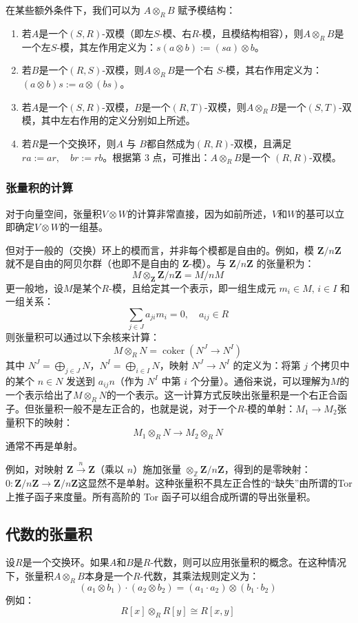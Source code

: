 在某些额外条件下，我们可以为 \( A \otimes_R B \) 赋予模结构：

\begin{enumerate}
\item 若\( A \)是一个\( (S, R) \)-双模（即左\( S \)-模、右\( R \)-模，且模结构相容），则\(A \otimes_R B\)是一个左\( S \)-模，其左作用定义为：\(s(a \otimes b) := (sa) \otimes b\)。
\item 若\( B \)是一个\( (R, S) \)-双模，则\(A \otimes_R B\)是一个右 \( S \)-模，其右作用定义为：\((a \otimes b)s := a \otimes (bs)\)。
\item 若\( A \)是一个\( (S, R) \)-双模，\( B \)是一个\( (R, T) \)-双模，则\(A \otimes_R B \)是一个\( (S, T) \)-双模，其中左右作用的定义分别如上所述。
\item 若\( R \)是一个交换环，则\( A \) 与 \( B \)都自然成为\( (R, R) \)-双模，且满足\(ra := ar, \quad br := rb\)。根据第 3 点，可推出：\(A \otimes_R B\)是一个 \( (R, R) \)-双模。
\end{enumerate}
\subsubsection{张量积的计算}
对于向量空间，张量积\( V \otimes W \)的计算非常直接，因为如前所述，\( V \)和\( W \)的基可以立即确定\( V \otimes W \)的一组基。

但对于一般的（交换）环上的模而言，并非每个模都是自由的。例如，模 \( \mathbf{Z}/n\mathbf{Z} \) 就不是自由的阿贝尔群（也即不是自由的 \( \mathbf{Z} \)-模）。与 \( \mathbf{Z}/n\mathbf{Z} \) 的张量积为：
\[
M \otimes_{\mathbf{Z}} \mathbf{Z}/n\mathbf{Z} = M / nM~
\]
更一般地，设\( M \)是某个\( R \)-模，且给定其一个表示，即一组生成元 \( m_i \in M,\, i \in I \) 和一组关系：
\[
\sum_{j \in J} a_{ji} m_i = 0,\quad a_{ij} \in R~
\]
则张量积可以通过以下余核来计算：
\[
M \otimes_R N = \operatorname{coker}(N^J \to N^I)~
\]
其中 \( N^J = \bigoplus_{j \in J} N \)，\( N^I = \bigoplus_{i \in I} N \)，映射 \( N^J \to N^I \) 的定义为：将第 \( j \) 个拷贝中的某个 \( n \in N \) 发送到 \( a_{ij} n \)（作为 \( N^I \) 中第 \( i \) 个分量）。通俗来说，可以理解为\( M \)的一个表示给出了\( M \otimes_R N \)的一个表示。这一计算方式反映出张量积是一个右正合函子。但张量积一般不是左正合的，也就是说，对于一个\( R \)-模的单射：\(M_1 \to M_2\)张量积下的映射：
\[
M_1 \otimes_R N \to M_2 \otimes_R N~
\]
通常不再是单射。

例如，对映射 \( \mathbf{Z} \xrightarrow{n} \mathbf{Z} \)（乘以 \( n \)）施加张量 \( \otimes_{\mathbb{Z}} \mathbf{Z}/n\mathbf{Z} \)，得到的是零映射：\(0 : \mathbf{Z}/n\mathbf{Z} \to \mathbf{Z}/n\mathbf{Z}\)这显然不是单射。这种张量积不具左正合性的“缺失”由所谓的Tor 上推子函子来度量。所有高阶的 Tor 函子可以组合成所谓的导出张量积。
\subsection{代数的张量积}
设\( R \)是一个交换环。如果\( A \)和\( B \)是\( R \)-代数，则可以应用张量积的概念。在这种情况下，张量积\( A \otimes_R B \)本身是一个\( R \)-代数，其乘法规则定义为：
\[
(a_1 \otimes b_1) \cdot (a_2 \otimes b_2) = (a_1 \cdot a_2) \otimes (b_1 \cdot b_2)~
\]
例如：
\[
R[x] \otimes_R R[y] \cong R[x, y]~
\]


